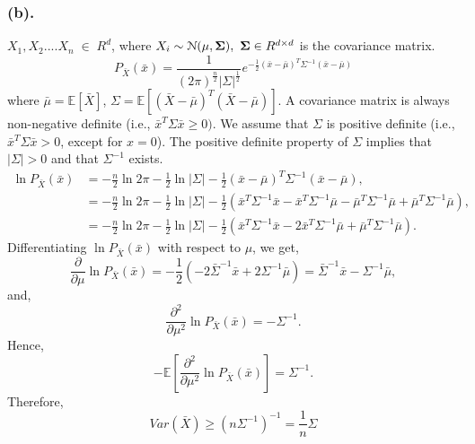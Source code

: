 \documentclass[a4paper,english,12pt]{article}
\begin{document}
\subsubsection*{(b).}
$X_1,X_2....X_n\; \in \;R^{d}$, where $X_i \sim \mathcal{N}({\bf \mu},{\bf \Sigma}),~{\bf \Sigma}\in R^{d\times d}$ is the covariance matrix.
\begin{equation*}
P_{\bar X}(\bar x) = \frac{1}{(2\pi)^{\frac{n}{2}} {|\Sigma|^{\frac{1}{2}}}} e^{-\frac{1}{2} (\bar x - \bar \mu)^{T} \Sigma^{-1} (\bar x - \bar \mu)}
\end{equation*}
where $\bar{\mu} = \mathbb{E}[\bar X] $, $ \Sigma = \mathbb{E}[(\bar X - \bar \mu)^{T} (\bar X - \bar \mu)]$. A covariance matrix is always non-negative definite (i.e., $\bar x^{T}\Sigma \bar x \geq 0 )$. We assume that $\Sigma$ is positive definite (i.e., $\bar x^{T}\Sigma \bar x > 0$, except for $x=0$). The positive definite property of $\Sigma$ implies that $|\Sigma|>0$ and that $\Sigma^{-1}$ exists.
\begin{align*}
\ln P_{\bar X}(\bar x) &= -\frac{n}{2}\ln2\pi - \frac{1}{2}\ln | \Sigma | - \frac{1}{2}(\bar x- \bar{\mu})^{T}\Sigma^{-1}(\bar x- \bar \mu),\\
&= - \frac{n}{2}\ln2\pi - \frac{1}{2}\ln | \Sigma | - \frac{1}{2} (\bar x^{T}\Sigma^{-1} \bar x - \bar x^{T} \Sigma^{-1} \bar \mu - \bar \mu^{T} \Sigma^{-1} \bar \mu + \bar \mu^{T} \Sigma^{-1}\bar \mu),\\
&= - \frac{n}{2}\ln2\pi - \frac{1}{2}\ln | \Sigma | - \frac{1}{2} (\bar x^{T}\Sigma^{-1} \bar x - 2\bar x^{T} \Sigma^{-1} \bar \mu + \bar \mu^{T} \Sigma^{-1}\bar \mu).
\end{align*}
Differentiating $\ln P_{\bar X}(\bar x)$ with respect to $\mu$, we get,
\begin{equation*}
\frac{\partial}{\partial \mu}\ln P_{\bar X}(\bar x) = - \frac{1}{2} (-2 \bar \Sigma^{-1}\bar x + 2\Sigma^{-1}\bar\mu)=\bar \Sigma^{-1}\bar x - \Sigma^{-1}\bar\mu,
\end{equation*}
and,
\begin{equation*}
\frac{\partial^{2}}{\partial \mu^{2}} \ln P_{\bar X}(\bar x) = -\Sigma^{-1}.
\end{equation*}
Hence,
\begin{equation*}
-\mathbb{E}\left[\frac{\partial^{2}}{\partial \mu^{2}} \ln P_{\bar X}(\bar x)\right] = \Sigma^{-1}.
\end{equation*}
Therefore, 
\begin{equation*}
Var(\bar X) \geq (n\Sigma^{-1})^{-1}=\frac{1}{n}\Sigma
\end{equation*}
\end{document}
